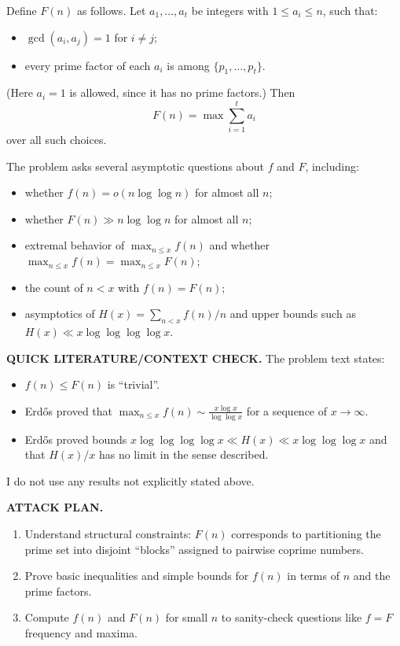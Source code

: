 Define $F(n)$ as follows. Let $a_1,\dots,a_t$ be integers with $1\le a_i\le n$, such that:
\begin{itemize}
\item $\gcd(a_i,a_j)=1$ for $i\ne j$;
\item every prime factor of each $a_i$ is among $\{p_1,\dots,p_t\}$.
\end{itemize}
(Here $a_i=1$ is allowed, since it has no prime factors.)
Then
\[
 F(n)=\max \sum_{i=1}^t a_i
\]
over all such choices.

The problem asks several asymptotic questions about $f$ and $F$, including:
\begin{itemize}
\item whether $f(n)=o(n\log\log n)$ for almost all $n$;
\item whether $F(n)\gg n\log\log n$ for almost all $n$;
\item extremal behavior of $\max_{n\le x} f(n)$ and whether $\max_{n\le x} f(n)=\max_{n\le x}F(n)$;
\item the count of $n<x$ with $f(n)=F(n)$;
\item asymptotics of $H(x)=\sum_{n<x} f(n)/n$ and upper bounds such as $H(x)\ll x\log\log\log\log x$.
\end{itemize}

\medskip
\noindent\textbf{QUICK LITERATURE/CONTEXT CHECK.}
The problem text states:
\begin{itemize}
\item $f(n)\le F(n)$ is ``trivial''.
\item Erd\H{o}s proved that $\max_{n\le x} f(n)\sim \frac{x\log x}{\log\log x}$ for a sequence of $x\to\infty$.
\item Erd\H{o}s proved bounds $x\log\log\log\log x\ll H(x)\ll x\log\log\log x$ and that $H(x)/x$ has no limit in the sense described.
\end{itemize}
I do not use any results not explicitly stated above.

\medskip
\noindent\textbf{ATTACK PLAN.}
\begin{enumerate}
\item Understand structural constraints: $F(n)$ corresponds to partitioning the prime set into disjoint ``blocks'' assigned to pairwise coprime numbers.
\item Prove basic inequalities and simple bounds for $f(n)$ in terms of $n$ and the prime factors.
\item Compute $f(n)$ and $F(n)$ for small $n$ to sanity-check questions like $f=F$ frequency and maxima.
\end{enumerate}

